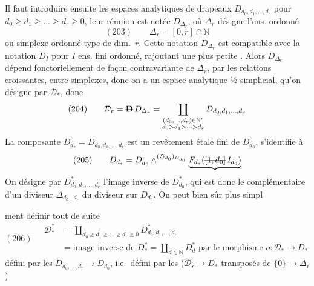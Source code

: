 \documentclass[11pt,a4paper]{article}
\begin{document}
Il faut introduire ensuite les espaces analytiques de drapeaux
$D_{d_0,d_1,\dots,d_r}$ pour $d_0 \geqslant d_1 \geqslant \dots \geqslant d_r \geqslant 0$,
leur réunion est notée $D_{\Delta_r}$, où $\Delta_r$ désigne l'ens. ordonné
\[
  (203) \qquad \Delta_r = [0,r] \cap \mathbb{N}
\]
ou simplexe ordonné type de dim.~$r$. Cette notation $D_{\Delta_r}$ est
compatible avec la notation $D_I$ pour $I$ ens. fini ordonné, rajoutant une
plus petite . Alors $D_{\Delta_r}$ dépend fonctoriellement de
façon contravariante de $\Delta_r$, par les relations croissantes, entre simplexes,
donc on a un espace analytique ½-simplicial, qu'on désigne par
$\mathcal{D}_{*}$, donc
\[
  (204) \qquad \mathcal{D}_r = \text{\struck{$\mathbf{D}$}}\, D_{\Delta_r}
  = \coprod_{\substack{(d_0,\dots,d_r) \in \mathbb{N}^{r} \\ d_0 > d_1 > \dots > d_r}}
  D_{d_0,d_1,\dots,d_r}
\]
\struck{\ill{}} La composante $D_{d_*} = D_{d_0,d_1,\dots,d_r}$ est un revêtement
étale fini de $D_{d_0}$, s'identifie à
\[
  (205) \qquad D_{d_*} = D^{!}_{d_0} \wedge^{(\mathfrak{S}_{d_0})_{D_{d_0}}}
  \underbrace{F_{d_*}(\text{\struck{$[1,d_0]$}}\, I_{d_0})}
\]
On désigne par $D^{*}_{d_0,d_1,\dots,d_r}$ l'image inverse de $D^{*}_{d_0}$,
qui est donc le complémentaire d'un diviseur $\Delta_{d_0 \dots d_r}$
du diviseur  sur $D_{d_0}$. On peut bien sûr plus simpl

ment définir tout de suite
\[
  (206) \quad
  \begin{aligned}
    \mathcal{D}^{*}_{*} &= \coprod_{d_0 \geqslant d_1 \geqslant \dots \geqslant d_r \geqslant 0} D^{*}_{d_0,d_1,\dots,d_r} \\
    &= \text{image inverse de } D^{*}_{*} = \coprod_{d \in \mathbb{N}} D^{*}_d
    \text{ par le morphisme } o : \mathcal{D}_{*} \to D_{*}
  \end{aligned}
\]
défini par les $D_{d_0,\dots,d_r} \to D_{d_0}$, i.e.\ défini par les
 ($\mathcal{D}_r \to D_{*}$ transposés de
$\{0\} \to \Delta_r$)
\end{document}
